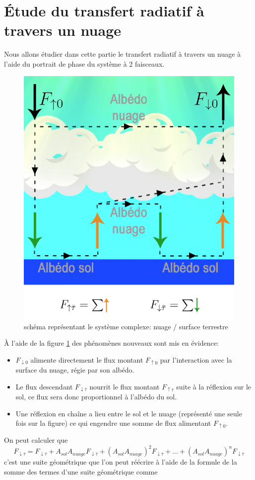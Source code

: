 \documentclass[12pt]{article}
\begin{document}
\section{Étude du transfert radiatif à travers un nuage}
Nous allons étudier dans cette partie le transfert radiatif à travers un nuage à l'aide du portrait de phase du système à 2 faisceaux.
\begin{figure}[H]
    \centering
    \includegraphics[width=0.5 \textwidth]{Schema/nuage.png}
    \caption{schéma représentant le système complexe: nuage / surface terrestre}
    \label{fig:nuage}
\end{figure}
À l'aide de la figure \ref{fig:nuage} des phénomènes nouveaux sont mis en évidence:
\begin{itemize}
    \item $F_{\downarrow0}$ alimente directement le flux montant $F_{\uparrow0}$ par l'interaction avec la surface du nuage, régie par son albédo.
    \item Le flux descendant $F_{\downarrow\bar{\tau}}$ nourrit le flux montant $F_{\uparrow\bar{\tau}}$ suite à la réflexion sur le sol, ce flux sera donc proportionnel à l'albédo du sol.
    \item Une réflexion en chaîne a lieu entre le sol et le nuage (représenté une seule fois sur la figure) ce qui engendre une somme de flux alimentant $F_{\uparrow0}$.
\end{itemize}
On peut calculer que 
\begin{equation}
    F_{\downarrow\bar{\tau}}=F_{\downarrow\bar{\tau}} + A_{sol}A_{nuage}F_{\downarrow\bar{\tau}} + (A_{sol}A_{nuage})^2F_{\downarrow\bar{\tau}}+\dots+ (A_{sol}A_{nuage})^nF_{\downarrow\bar{\tau}}
\end{equation}
c'est une suite géométrique que l'on peut réécrire à l'aide de la formule de la somme des termes d'une suite géométrique comme
\end{document}
